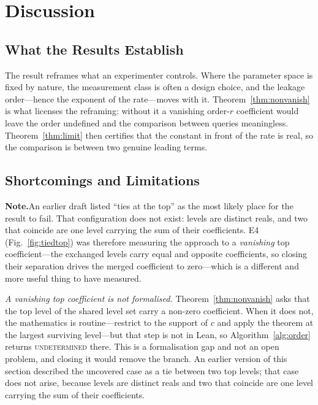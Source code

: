 \documentclass[conference]{IEEEtran}
\theoremstyle{definition}
\newif\ifshownotes\shownotestrue
\newcommand{\NOTEPAR}[1]{\ifshownotes\par\vspace{2pt}\noindent%
  {\color{notecol}\textsf{\footnotesize\textbf{Note.}\;#1}}\par\vspace{2pt}\fi}
\begin{document}
\section{Discussion}
\label{sec:discussion}

\subsection{What the Results Establish}

The result reframes what an experimenter controls. Where the parameter space is fixed by
nature, the measurement class is often a design choice, and the leakage order---hence the
exponent of the rate---moves with it. Theorem~\ref{thm:nonvanish} is what licenses the
reframing: without it a vanishing order-$r$ coefficient would leave the order undefined and
the comparison between queries meaningless. Theorem~\ref{thm:limit} then certifies that the
constant in front of the rate is real, so the comparison is between two genuine leading
terms.

\subsection{Shortcomings and Limitations}
\NOTEPAR{An earlier draft listed ``ties at the top'' as the most likely place for the
result to fail. That configuration does not exist: levels are distinct reals, and two that
coincide are one level carrying the sum of their coefficients. E4 (Fig.~\ref{fig:tiedtop}) was
therefore measuring the approach to a \emph{vanishing} top coefficient---the exchanged levels
carry equal and opposite coefficients, so closing their separation drives the merged
coefficient to zero---which is a different and more useful thing to have measured.}
\label{sec:limits}

\emph{A vanishing top coefficient is not formalised.} Theorem~\ref{thm:nonvanish} asks that
the top level of the shared level set carry a non-zero coefficient. When it does not, the
mathematics is routine---restrict to the support of $c$ and apply the theorem at the largest
surviving level---but that step is not in Lean, so Algorithm~\ref{alg:order} returns
\textsc{undetermined} there. This is a formalisation gap and not an open problem, and closing
it would remove the branch. An earlier version of this section described the uncovered case as
a tie between two top levels; that case does not arise, because levels are distinct reals and
two that coincide are one level carrying the sum of their coefficients.
\end{document}
